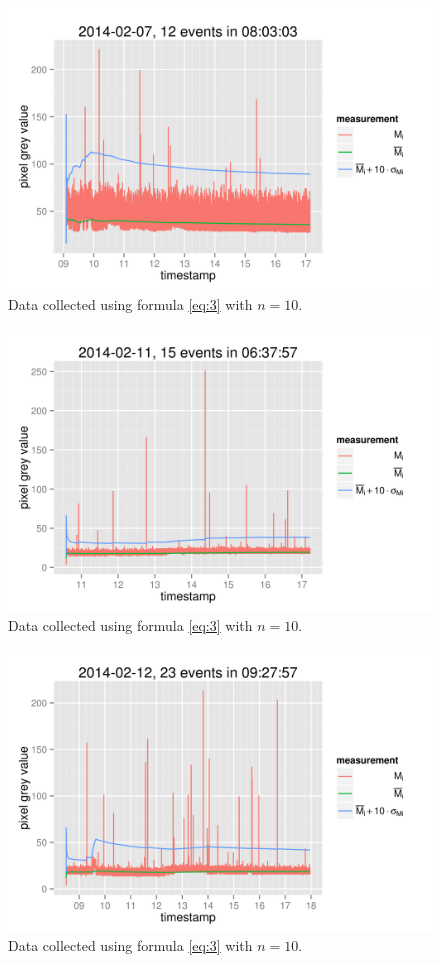 \documentclass[a4paper,12pt]{article}
\begin{document}
\begin{figure}[h!]
  \centering
  \includegraphics{20140207.png}
  \caption{Data collected using formula \ref{eq:3} with $n=10$.}
\end{figure}

\begin{figure}[h!]
  \centering
  \includegraphics{20140211.png}
  \caption{Data collected using formula \ref{eq:3} with $n=10$.}
\end{figure}

\begin{figure}[h!]
  \centering
  \includegraphics{20140212.png}
  \caption{Data collected using formula \ref{eq:3} with $n=10$.}
\end{figure}
\end{document}
